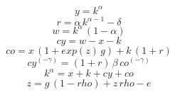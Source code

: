\begin{dmath}
{y}={k}^{{\alpha}}
\end{dmath}
\begin{dmath}
{r}={\alpha}\, {k}^{{\alpha}-1}-{\delta}
\end{dmath}
\begin{dmath}
{w}={k}^{{\alpha}}\, \left(1-{\alpha}\right)
\end{dmath}
\begin{dmath}
{cy}={w}-{x}-{k}
\end{dmath}
\begin{dmath}
{co}={x}\, \left(1+exp\left({z}\right)\, {g}\right)+{k}\, \left(1+{r}\right)
\end{dmath}
\begin{dmath}
{cy}^{\left(-{\gamma}\right)}=\left(1+{r}\right)\, {\beta}\, {co}^{\left(-{\gamma}\right)}
\end{dmath}
\begin{dmath}
{k}^{{\alpha}}={x}+{k}+{cy}+{co}
\end{dmath}
\begin{dmath}
{z}={g}\, \left(1-{rho}\right)+{z}\, {rho}-{e}
\end{dmath}
